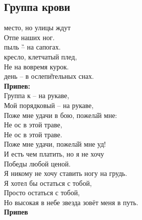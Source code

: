 \documentclass[fleqn,a5paper,12pt,twoside]{guitartabs}
\newcommand{\musVspace}{\vspace{2mm}}
\begin{document}
\subsection*{Группа крови}
     место, но улицы ждут\\
    Отпе наших ног. \\
     пыль \G{-- }на сапогах.  \\
     кресло, клетчатый плед, \\
    Не на вовремя курок. \\
     день -- в ослеп\G{ительных} снах.  \musVspace\\
    \-\hspace{10mm}\textbf{Припев:}\\    
    \-\hspace{10mm}Группа к -- на рукаве,\\
    \-\hspace{10mm}Мой порядковый  -- на рукаве,\\
    \-\hspace{10mm}Поже мне удачи в бою, пожел\G{ай} мне:\\
    \-\hspace{10mm}Не ос в этой траве,\\
    \-\hspace{10mm}Не ос в этой траве. \\
    \-\hspace{10mm}Поже мне удачи, пожел\G{ай} мне уд! \musVspace\\
    И есть чем платить, но я не хочу \\
    Победы любой ценой.         \\
    Я никому не хочу ставить ногу на грудь. \\
    Я хотел бы остаться с тобой, \\
    Просто остаться с тобой,\\
    Но высокая в небе звезда зовёт меня в путь. \musVspace\\
    \-\hspace{10mm}\textbf{Припев}
\newpage
{}%
\end{document}
